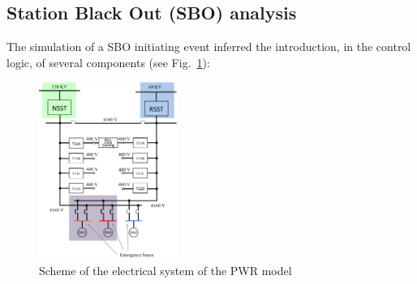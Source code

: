 \subsection{Station Black Out (SBO) analysis} 
\label{sec:SBOanalysis}
The simulation of a SBO initiating event inferred the introduction, in the control logic, of several components (see Fig.~\ref{fig:SchemeElSystem}):
\begin{figure}[h]
   \centering
    \includegraphics[width=0.4\textwidth]{figures/SchemeEletricalSystem.png}
    \caption{Scheme of the electrical system of the PWR model}
    \label{fig:SchemeElSystem}
\end{figure}

